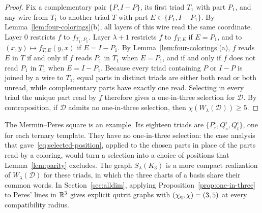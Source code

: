 \begin{proof}
Fix a complementary pair $\{P,I-P\}$, its first triad $T_1$ with part $P_1$, and any wire from $T_1$ to another triad $T$ with part $E\in\{P_1,I-P_1\}$. By Lemma~\ref{lem:four-colorings}(b), all layers of this wire read the same coordinate. Layer $0$ restricts $f$ to $f_{T_1,P_1}$. Layer $\lambda+1$ restricts $f$ to $f_{T,E}$ if $E=P_1$, and to $(x,y)\mapsto f_{T,E}(y,x)$ if $E=I-P_1$. By Lemma~\ref{lem:four-colorings}(a), $f$ reads $E$ in $T$ if and only if $f$ reads $P_1$ in $T_1$ when $E=P_1$, and if and only if $f$ does not read $P_1$ in $T_1$ when $E=I-P_1$. Because every triad containing $P$ or $I-P$ is joined by a wire to $T_1$, equal parts in distinct triads are either both read or both unread, while complementary parts have exactly one read. Selecting in every triad the unique part read by $f$ therefore gives a one-in-three selection for $\mathcal D$. By contraposition, if $\mathcal D$ admits no one-in-three selection, then $\chi(W_\lambda(\mathcal D))\ge5$.
\end{proof}

The Mermin--Peres square is an example. Its eighteen triads are $\{P^i_r,Q^i_s,Q^i_t\}$, one for each ternary template. They have no one-in-three selection: the case analysis that gave~\eqref{eq:selected-position}, applied to the chosen parts in place of the parts read by a coloring, would turn a selection into a choice of positions that Lemma~\ref{lem:parity} excludes. The graph $S_\lambda(K_3)$ is a more compact realization of $W_\lambda(\mathcal D)$ for these triads, in which the three charts of a basis share their common words. In Section~\ref{sec:alldim}, applying Proposition~\ref{prop:one-in-three} to Peres' lines in $\mathbb R^3$ gives explicit qutrit graphs with $(\chi_{\mathrm q},\chi)=(3,5)$ at every compatibility radius.

